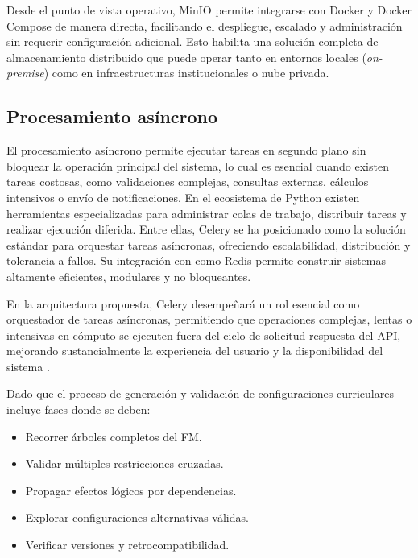 Desde el punto de vista operativo, MinIO permite integrarse con Docker y Docker 
Compose de manera directa, facilitando el despliegue, escalado y administración sin 
requerir configuración adicional. Esto habilita una solución completa de 
almacenamiento distribuido que puede operar tanto en entornos locales (\textit{on-premise}) 
como en infraestructuras institucionales o nube privada.

\subsection{Procesamiento asíncrono}

El procesamiento asíncrono permite ejecutar tareas en segundo plano sin bloquear 
la operación principal del sistema, lo cual es esencial cuando existen tareas costosas, 
como validaciones complejas, consultas externas, cálculos intensivos o envío de 
notificaciones. En el ecosistema de Python existen herramientas especializadas para 
administrar colas de trabajo, distribuir tareas y realizar ejecución diferida. Entre 
ellas, Celery se ha posicionado como la solución estándar para orquestar tareas 
asíncronas, ofreciendo escalabilidad, distribución y tolerancia a fallos. Su integración 
con  como Redis permite construir sistemas altamente eficientes, modulares y no 
bloqueantes.

En la arquitectura propuesta, Celery desempeñará un rol esencial como 
orquestador de tareas asíncronas, permitiendo que operaciones complejas, 
lentas o intensivas en cómputo se ejecuten fuera del ciclo de solicitud-respuesta 
del \ac{API}, mejorando sustancialmente la experiencia del usuario y la disponibilidad 
del sistema \citep{celery2025docs}.

Dado que el proceso de generación y validación de configuraciones curriculares 
incluye fases donde se deben:
\begin{itemize}
    \item Recorrer árboles completos del \ac{FM}.
    
    \item Validar múltiples restricciones cruzadas.
    
    \item Propagar efectos lógicos por dependencias.
    
    \item Explorar configuraciones alternativas válidas.
    
    \item Verificar versiones y retrocompatibilidad.
\end{itemize}

